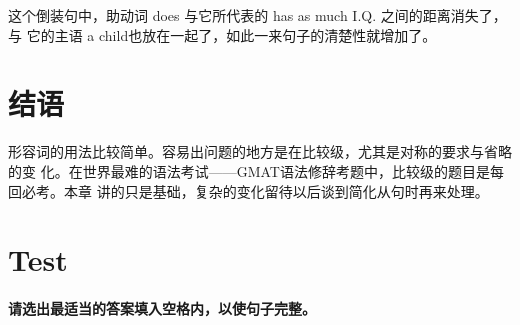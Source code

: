 这个倒装句中，助动词 does 与它所代表的 has as much I.Q. 之间的距离消失了，与
它的主语 a child也放在一起了，如此一来句子的清楚性就增加了。

\section{结语}

形容词的用法比较简单。容易出问题的地方是在比较级，尤其是对称的要求与省略的变
化。在世界最难的语法考试——GMAT语法修辞考题中，比较级的题目是每回必考。本章
讲的只是基础，复杂的变化留待以后谈到简化从句时再来处理。

\section{Test}

\paragraph{请选出最适当的答案填入空格内，以使句子完整。}


